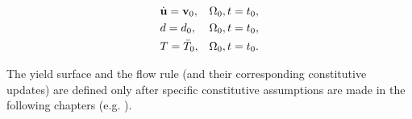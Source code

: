 \begin{mdframed}[
  frametitle={The initial boundary value problem for the time interval $t \in I = [t_0, t_f]$},
  frametitlebackgroundcolor=gray!20,
  backgroundcolor=gray!5,
  linewidth=0pt,
  nobreak=true
  ]
\begin{align*}
                                     & \dot{\textbf{u}} = \textbf{v}_0,                                                &  & \Omega_0, t = t_0,                                 \\
                                     & d = d_0,                                                            &  & \Omega_0, t = t_0,                                 \\
                                     & T = \bar{T}_0,                                                      &  & \Omega_0, t = t_0.                                 
  \end{align*}
\end{mdframed}
The yield surface and the flow rule (and their corresponding constitutive updates) are defined only after specific constitutive assumptions are made in the following chapters (e.g. ).

